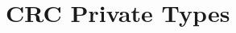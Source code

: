 \hypertarget{group___c_r_c___private___types}{}\section{C\+RC Private Types}
\label{group___c_r_c___private___types}
